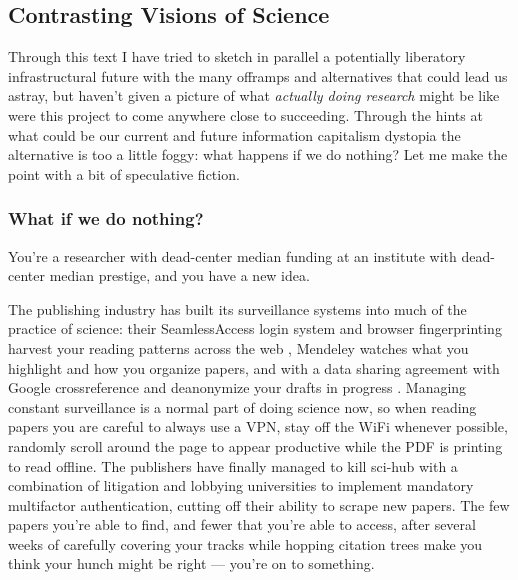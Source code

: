 \documentclass[10pt]{article}
\begin{document}
\hypertarget{contrasting-visions-of-science}{%
\subsection{Contrasting Visions of
Science}\label{contrasting-visions-of-science}}


\begin{multicols}{2}
 Through this text I have tried to sketch in parallel a
potentially liberatory infrastructural future with the many offramps and
alternatives that could lead us astray, but haven't given a picture of
what \emph{actually doing research} might be like were this project to
come anywhere close to succeeding. Through the hints at what could be
our current and future information capitalism dystopia the alternative
is too a little foggy: what happens if we do nothing? Let me make the
point with a bit of speculative fiction.

\hypertarget{what-if-we-do-nothing}{%
\subsubsection{What if we do nothing?}\label{what-if-we-do-nothing}}

You're a researcher with dead-center median funding at an institute with
dead-center median prestige, and you have a new idea.

The publishing industry has built its surveillance systems into much of
the practice of science: their SeamlessAccess login system and browser
fingerprinting harvest your reading patterns across the web\cite{sariGuestPostTechnology2018, brembsSNSINewPRISM2020, nisoNISORP272019Recommended2019, snsiCybersecurityLandscapeProtecting2020, SeamlessAccessActionSeamlessAccess} , Mendeley watches what you
highlight and how you organize papers, and with a data sharing agreement
with Google crossreference and deanonymize your drafts in progress \cite{pooleySurveillancePublishing2021} . Managing constant
surveillance is a normal part of doing science now, so when reading
papers you are careful to always use a VPN, stay off the WiFi whenever
possible, randomly scroll around the page to appear productive while the
PDF is printing to read offline. The publishers have finally managed to
kill sci-hub with a combination of litigation and lobbying universities
to implement mandatory multifactor authentication, cutting off their
ability to scrape new papers. The few papers you're able to find, and
fewer that you're able to access, after several weeks of carefully
covering your tracks while hopping citation trees make you think your
hunch might be right --- you're on to something.


\end{multicols}
\end{document}
